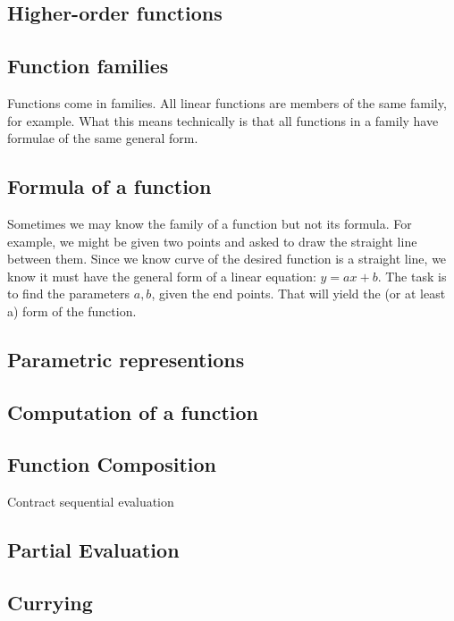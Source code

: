 \documentclass[12pt]{tufte-handout}
\numberwithin{equation}{subsection}
\numberwithin{equation}{subsection}
\begin{document}
  \subsection{Higher-order functions}
  \label{subs:hiordfunc}


  \subsection{Function families}
  \label{subs:funcfamilies}

  Functions come in families.  All linear functions are members of the
  same family, for example.  What this means technically is that all
  functions in a family have formulae of the same general form.

  \subsection{Formula of a function}
  \label{subs:funcform}

  Sometimes we may know the family of a function but not its formula.
  For example, we might be given two points and asked to draw the
  straight line between them.  Since we know curve of the desired
  function is a straight line, we know it must have the general form
  of a linear equation: \(y=ax+b\).  The task is to find the
  parameters \(a,b\), given the end points.  That will yield the (or
  at least a) form of the function.

  \subsection{Parametric representions}

  \subsection{Computation of a function}


  \subsection{Function Composition}
  Contract sequential evaluation
  \subsection{Partial Evaluation}
  \subsection{Currying}
\end{document}
